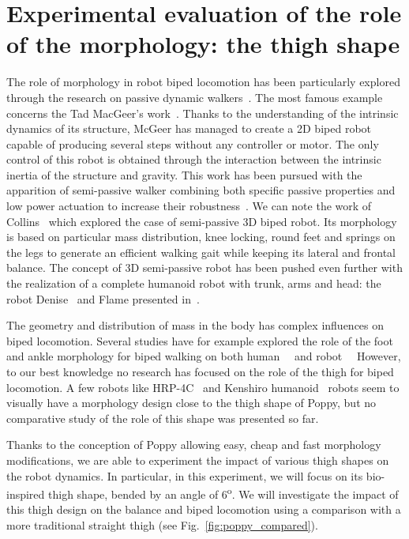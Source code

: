 
\newpage
\section{Experimental evaluation of the role of the morphology: the thigh shape} %
\label{sec:morphology-role}

The role of morphology in robot biped locomotion has been particularly explored through the research on passive dynamic walkers~\cite{wisse2007passive}. The most famous example concerns the Tad MacGeer's work~\cite{mcgeer1990passive}. Thanks to the understanding of the intrinsic dynamics of its structure, McGeer has managed to create a 2D biped robot capable of producing several steps without any controller or motor.
The only control of this robot is obtained through the interaction between the intrinsic inertia of the structure and gravity.
This work has been pursued with the apparition of semi-passive walker combining both specific passive properties and low power actuation to increase their robustness~\cite{Anderson2005}. We can note the work of Collins~\cite{collins2005bipedal} which explored the case of semi-passive 3D biped robot. Its morphology is based on particular mass distribution, knee locking, round feet and springs on the legs to generate an efficient walking gait while keeping its lateral and frontal balance.
The concept of 3D semi-passive robot has been pushed even further with the realization of a complete humanoid robot with trunk, arms and head: the robot Denise~\cite{wisse2005three} and Flame presented in~\cite{Hobbelen2008}.

The geometry and distribution of mass in the body has complex influences on biped locomotion. Several studies have for example explored the role of the foot and ankle morphology for biped walking on both human~\cite{Adamczyk2006}~\cite{Hughes1990} and robot~\cite{hobbelen2005ankle}~\cite{Davis2010} However, to our best knowledge no research has focused on the role of the thigh for biped locomotion.  A few robots like HRP-4C~\cite{kaneko2009cybernetic} and Kenshiro humanoid~\cite{nakanishi2013design} robots seem to visually have a morphology design close to the thigh shape of Poppy, but no comparative study of the role of this shape was presented so far.

Thanks to the conception of Poppy allowing easy, cheap and fast morphology modifications, we are able to experiment the impact of various thigh shapes on the robot dynamics. In particular, in this experiment, we will focus on its bio-inspired thigh shape, bended by an angle of 6\textsuperscript{o}. We will investigate the impact of this thigh design on the balance and biped locomotion using a comparison with a more traditional straight thigh (see Fig.~\ref{fig:poppy_compared}).

